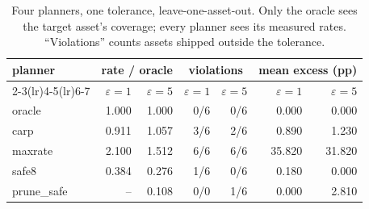\begin{table}[t]
\centering
\small
\footnotesize
\setlength{\tabcolsep}{2.8pt}
\caption{Four planners, one tolerance, leave-one-asset-out. Only the oracle sees the target asset's coverage; every planner sees its measured rates. ``Violations'' counts assets shipped outside the tolerance.}
\label{tab:planners}
\begin{tabular}{lrrrrrr}
\toprule
planner & \multicolumn{2}{c}{rate / oracle} & \multicolumn{2}{c}{violations} & \multicolumn{2}{c}{mean excess (pp)} \\
\cmidrule(lr){2-3}\cmidrule(lr){4-5}\cmidrule(lr){6-7}
 & $\varepsilon{=}1$ & $\varepsilon{=}5$ & $\varepsilon{=}1$ & $\varepsilon{=}5$ & $\varepsilon{=}1$ & $\varepsilon{=}5$ \\
\midrule
oracle & 1.000 & 1.000 & 0/6 & 0/6 & 0.000 & 0.000 \\
carp & 0.911 & 1.057 & 3/6 & 2/6 & 0.890 & 1.230 \\
maxrate & 2.100 & 1.512 & 6/6 & 6/6 & 35.820 & 31.820 \\
safe8 & 0.384 & 0.276 & 1/6 & 0/6 & 0.180 & 0.000 \\
prune\_safe & -- & 0.108 & 0/0 & 1/6 & 0.000 & 2.810 \\
\bottomrule
\end{tabular}
\end{table}
